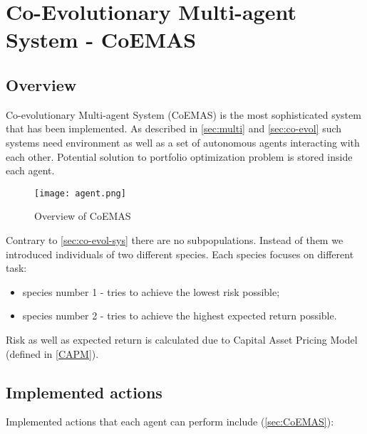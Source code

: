 \section{Co-Evolutionary Multi-agent System - CoEMAS}

\subsection{Overview}

Co-evolutionary Multi-agent System (CoEMAS) is the most sophisticated system that has been implemented.
As described in \ref{sec:multi} and \ref{sec:co-evol} such systems need environment as well as a set of autonomous agents interacting with each other.
Potential solution to portfolio optimization problem is stored inside each agent.


\begin{figure}[ht]   
	    \begin{center}
	      \texttt{[image: agent.png]}
	    \end{center}
	    \caption{Overview of CoEMAS} 
	  \end{figure}

Contrary to \ref{sec:co-evol-sys} there are no subpopulations.
Instead of them we introduced individuals of two different species.
Each species focuses on different task:

\begin{itemize}
  \item species number 1 - tries to achieve the lowest risk possible;
  \item species number 2 - tries to achieve the highest expected return possible.
\end{itemize}

Risk as well as expected return is calculated due to Capital Asset Pricing Model (defined in \ref{CAPM}).

\subsection{Implemented actions}

Implemented actions that each agent can perform include (\ref{sec:CoEMAS}):

